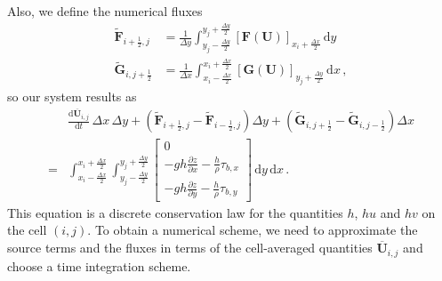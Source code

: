\documentclass[10pt,a4paper]{article}
\newcommand{\dx}{\ensuremath{\Delta x}}
\newcommand{\dy}{\ensuremath{\Delta y}}
\begin{document}
	Also, we define the numerical fluxes
	\begin{subequations}
		\begin{align}
		\tilde{\boldsymbol{F}}_{i+\frac{1}{2},j} &= \frac{1}{\dy} \int_{y_j-\frac{\dy}{2}}^{y_j+\frac{\dy}{2}} \left[\boldsymbol{F}\left(\boldsymbol{U}\right)\right]_{x_i+\frac{\dx}{2}}\,\mathrm{d}y \\
		\tilde{\boldsymbol{G}}_{i,j+\frac{1}{2}} &= \frac{1}{\dx} \int_{x_i-\frac{\dx}{2}}^{x_i+\frac{\dx}{2}}\left[\boldsymbol{G}\left(\boldsymbol{U}\right)\right]_{y_j+\frac{\dy}{2}} \,\mathrm{d}x \,,
		\end{align}
	\end{subequations}
	so our system results as
	\begin{equation}
	\begin{split}
	& \frac{\mathrm{d}\overline{\boldsymbol{U}}_{i,j}}{\mathrm{d}t}\,\dx\,\dy +\left(\tilde{\boldsymbol{F}}_{i+\frac{1}{2},j} -\tilde{\boldsymbol{F}}_{i-\frac{1}{2},j} \right)\dy + \left( \tilde{\boldsymbol{G}}_{i,j+\frac{1}{2}}-\tilde{\boldsymbol{G}}_{i,j-\frac{1}{2}}\right)\dx \\
	=& \int_{x_i-\frac{\dx}{2}}^{x_i+\frac{\dx}{2}}\int_{y_j-\frac{\dy}{2}}^{y_j+\frac{\dy}{2}} \begin{bmatrix}
	0 \\ -g h \frac{\partial z}{\partial x} - \frac{h}{\rho}\tau_{b,x} \\ -g h \frac{\partial z}{\partial y} - \frac{h}{\rho}\tau_{b,y}
	\end{bmatrix} \,\mathrm{d}y\,\mathrm{d}x\,.
	\end{split}
	\end{equation}
	This equation is a discrete conservation law for the quantities $h$, $hu$ and $hv$ on the cell $(i,j)$. To obtain a numerical scheme, we need to approximate the source terms and the fluxes in terms of the cell-averaged quantities $\overline{\boldsymbol{U}}_{i,j}$ and choose a time integration scheme.
	

	
\end{document}

